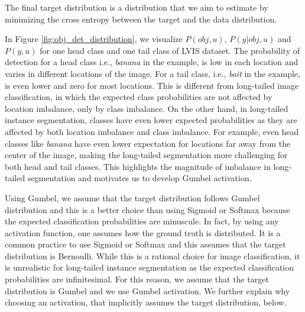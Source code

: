 \documentclass[runningheads]{llncs}
\begin{document}
The final target distribution is a distribution that we aim to estimate by minimizing the cross entropy between the target and the data distribution.

In Figure \ref{fig:obj_det_distribution}, we visualize $P(obj,u)$, $P(y|obj,u)$ and $P(y,u)$ for one head class and one tail class of LVIS dataset. 
The probability of detection for a head class i.e.,  \textit{banana} in the example, is low in each location and varies in different locations of the image. For a tail class, i.e.,  \textit{bait} in the example, is even lower and zero for most locations. This is different from long-tailed  image classification, in which the expected class probabilities are not affected by location imbalance, only by class imbalance. On the other hand, in long-tailed  instance segmentation, classes have even lower expected probabilities as they are affected by both location imbalance and class imbalance. For example, even head classes like \textit{banana} have even lower expectation for locations far away from the center of the image, making the long-tailed  segmentation more challenging for both head and tail classes. This highlights the magnitude of imbalance in long-tailed  segmentation and motivates us to develop Gumbel activation.

Using Gumbel, we assume that the target distribution follows Gumbel distribution and this is a better choice than using Sigmoid or Softmax because the expected classification probabilities are minuscule. In fact, by using any activation function, one assumes how the ground truth is distributed. It is a common practice to use Sigmoid or Softmax and this assumes that the target distribution is Bernoulli. While this is a rational choice for image classification, it is unrealistic for long-tailed instance segmentation as the expected classification probabilities are infinitesimal. For this reason, we assume that the target distribution is Gumbel and we use Gumbel activation. We further explain why choosing an activation, that implicitly assumes the target distribution, below.
\end{document}
